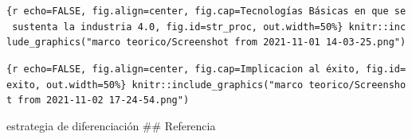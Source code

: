 \documentclass[11pt]{article}
\begin{document}
\texttt{\{r\ echo=FALSE,\ fig.align=\textquotesingle{}center\textquotesingle{},\ fig.cap=\textquotesingle{}Tecnologías\ Básicas\ en\ que\ se\ sustenta\ la\ industria\ 4.0\textquotesingle{},\ fig.id=\textquotesingle{}str\_proc\textquotesingle{},\ out.width=\textquotesingle{}50\%\textquotesingle{}\}\ knitr::include\_graphics("marco\ teorico/Screenshot\ from\ 2021-11-01\ 14-03-25.png")}

\texttt{\{r\ echo=FALSE,\ fig.align=\textquotesingle{}center\textquotesingle{},\ fig.cap=\textquotesingle{}Implicacion\ al\ éxito\textquotesingle{},\ fig.id=\textquotesingle{}exito\textquotesingle{},\ out.width=\textquotesingle{}50\%\textquotesingle{}\}\ knitr::include\_graphics("marco\ teorico/Screenshot\ from\ 2021-11-02\ 17-24-54.png")}

estrategia de diferenciación \#\# Referencia


    
    
    
\end{document}
